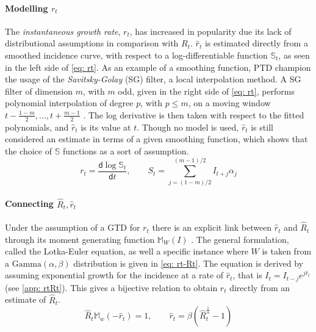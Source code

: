 \documentclass[12pt]{article}
\renewcommand{\d}{\mathsf{d}}
\begin{document}
      \paragraph{Modelling $r_t$} The \textit{instantaneous growth rate}, 
      $r_t$, has increased in popularity due its lack of distributional assumptions in comparison with $R_t$. $\hat{r}_t$ is estimated directly from a 
      smoothed incidence curve, with respect to a log-differentiable function $\mathbb{S}_t$, as seen in the left side of 
      \cref{eq: rt}. As an example of a smoothing function, PTD champion the
      usage of the \textit{Savitsky-Golay} (SG) filter, a local interpolation method. A SG filter of dimension $m$, with 
      $m$ odd, given in the right side of \cref{eq: rt}, performs polynomial interpolation of degree $p$, with $p \leq m$, on a 
      moving window $t - \frac{1 - m}{2}, \dots, t + \frac{m  - 1}{2}$ \citep{SavitzkyGolay1964}. The log derivative is then taken with respect to the fitted polynomials,
      and $\hat{r}_t$ is its value at $t$. Though no model is used, $\hat{r}_t$ is still considered an estimate in terms of a given smoothing function,
      which shows that the choice of $\mathbb{S}$ functions as a sort of assumption. 
      \begin{equation} \label{eq: rt}
        r_t = \frac{\d \log{\mathbb{S}_t}}{\d t}, \qquad S_t = \sum_{j = (1 - m)/2}^{(m  - 1)/2} I_{t + j}\alpha_j
      \end{equation}
      
      \paragraph{Connecting $\hat{R}_t, \hat{r}_t$} Under the assumption of a GTD for $r_t$ there is an explicit link between $\hat{r}_t$ 
      and $\hat{R}_t$ through its moment generating function $\mathbb{M}_W(I)$
      \citep{WallingaLipsitch2006}. The general formulation, called the Lotka-Euler equation,
      as well a specific instance where $W$ is taken from a 
      $\text{Gamma}(\alpha, \beta)$ distribution is given in \cref{eq: rt-Rt}. The equation is derived by assuming 
      exponential growth for the incidence at a rate of $\hat{r}_t$, that is $I_t = I_{t-j} e^{j \hat{r}_{t}}$
      (see \cref{app: rtRt}). This gives a bijective relation to obtain $\hat{r}_t$ directly from an estimate of $\hat{R}_t$. 
      \begin{equation} \label{eq: rt-Rt}
        \hat{R}_t \mathbb{M}_w(-\hat{r}_t) = 1, \qquad \hat{r}_t = \beta(\hat{R}_t^{\frac{1}{\alpha}} - 1)
      \end{equation}
\end{document}
